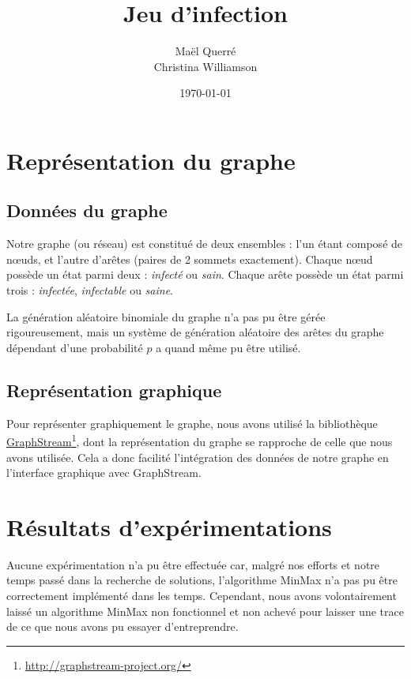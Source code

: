 \documentclass[a4paper, 11pt]{report}
\title{Jeu d'infection}
\date{\today}
\author{Maël Querré\\
        Christina Williamson}
\makeatletter
\def\@university{}
\def\@department{}
\def\@subject{}
\newcommand{\mytitle}{
  \begin{titlepage} %
  \hbox{
    \parbox[b]{.4\textwidth}{ %
      {\noindent\itshape\@university\\ %
      \@department} %
      \vskip.94\textheight %
    }
    \rule{1pt}{\textheight} %
    \hspace*{0.05\textwidth} %
    \parbox[b]{0.75\textwidth}{
      {\noindent\Huge\bfseries\@title} %
      \vskip 5em%
      {\large{\@subject}} %
      \vskip 9em%
      \@author %
      \vskip 0.4\textheight %
      {\noindent\@date}\\[\baselineskip] %
    }
  }
  \end{titlepage}
}
\makeatother
\begin{document}
\mytitle

\tableofcontents

\chapter{Représentation du graphe}

\section{Données du graphe}

Notre graphe (ou réseau) est constitué de deux ensembles : l'un étant composé de n\oe uds, et l'autre d'arêtes (paires de 2 sommets exactement). Chaque n\oe ud possède un état parmi deux : {\it infecté} ou {\it sain}. Chaque arête possède un état parmi trois : {\it infectée}, {\it infectable} ou {\it saine}.

La génération aléatoire binomiale du graphe n'a pas pu être gérée rigoureusement, mais un système de génération aléatoire des arêtes du graphe dépendant d'une probabilité $p$ a quand même pu être utilisé.

\section{Représentation graphique}

Pour représenter graphiquement le graphe, nous avons utilisé la bibliothèque \href{http://graphstream-project.org/}{GraphStream}\footnote{\url{http://graphstream-project.org/}}, dont la représentation du graphe se rapproche de celle que nous avons utilisée. Cela a donc facilité l'intégration des données de notre graphe en l'interface graphique avec GraphStream.


\chapter{Résultats d'expérimentations}

Aucune expérimentation n'a pu être effectuée car, malgré nos efforts et notre temps passé dans la recherche de solutions, l'algorithme MinMax n'a pas pu être correctement implémenté dans les temps. Cependant, nous avons volontairement laissé un algorithme MinMax non fonctionnel et non achevé pour laisser une trace de ce que nous avons pu essayer d'entreprendre.
\end{document}
